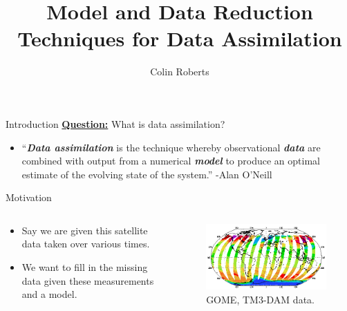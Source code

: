 \documentclass[aspectratio=169]{beamer}
\author{Colin Roberts}
\title{Model and Data Reduction Techniques for Data Assimilation}
\newcommand\boldgreen[1]{\textcolor{lighter_csu_green}{\emph{\textbf{#1}}}}
\begin{document}

\begin{frame}{Introduction}
\pause
\vfill
\textbf{\underline{Question:}} What is data assimilation?
\begin{itemize}
    \pause
    \item ``\boldgreen{Data assimilation} is the technique whereby observational \boldgreen{data} are combined with output from a numerical \boldgreen{model} to produce an optimal estimate of the evolving state of the system.'' \quad -Alan O'Neill
\end{itemize}
\vfill
\end{frame}


\begin{frame}{Motivation}
    \vfill
    \begin{columns}
    \begin{column}{.49\textwidth}
    \begin{itemize}
        \pause
        \item Say we are given this satellite data taken over various times.
        \item We want to fill in the missing data given these measurements and a model.
    \end{itemize}
    \end{column}

 \begin{column}{.49\textwidth}
        \begin{figure}[h]
            \centering
            \includegraphics[width=\columnwidth]{figures/gome_data.png}
            \caption{GOME, TM3-DAM data.}
        \end{figure}
 \end{column}
\end{columns}
\vfill
\end{frame}
\end{document}

